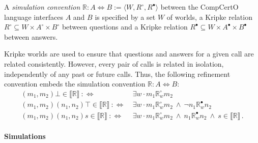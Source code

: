 \documentclass[acmsmall,screen,review,nonacm]{acmart}
\newcommand{\que}{\circ}
\newcommand{\ans}{\bullet}
\begin{document}
\begin{definition} \label{def:sconv} %
A \emph{simulation convention}
$\mathbb{R} : A \Leftrightarrow B := \langle W, R^\que, R^\ans \rangle$
between the CompCertO language interfaces $A$ and $B$ is specified by
a set $W$ of worlds,
a Kripke relation $R^\que \subseteq W \times A^\que \times B^\que$
between questions
and
a Kripke relation $R^\ans \subseteq W \times A^\ans \times B^\ans$
between answers.
\end{definition}

Kripke worlds are used to ensure that
questions and answers for a given call
are related consistently.
However, every pair of calls
is related in isolation,
independently of any past or future calls.
Thus, the following
refinement convention
embeds the simulation convention $\mathbb{R} : A \Leftrightarrow B$:
\begin{align*}
  (m_1, m_2) \bot \in \llbracket \mathbb{R} \rrbracket \: :\Leftrightarrow \: {}
   &\exists w \cdot m_1 \mathbb{R}^\que_w m_2
  \\
  (m_1, m_2) (n_1, n_2) \top \in \llbracket \mathbb{R} \rrbracket \::\Leftrightarrow\: {}
   &\exists w \cdot m_1 \mathbb{R}^\que_w m_2 \:\wedge\:
   \neg n_1 \mathbb{R}^\ans_w n_2
  \\
  (m_1, m_2) (n_1, n_2) s \in \llbracket \mathbb{R} \rrbracket \::\Leftrightarrow\: {}
   &\exists w \cdot m_1 \mathbb{R}^\que_w m_2 \:\wedge\:
   n_1 \mathbb{R}^\ans_w n_2 \:\wedge\:
     s \in \llbracket \mathbb{R} \rrbracket
  \,.
\end{align*}

\paragraph{Simulations}
\end{document}
